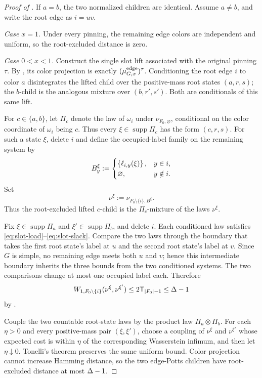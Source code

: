 \begin{proof}[Proof of ]
If \(a=b\), the two normalized children are identical.  Assume
\(a\ne b\), and write the root edge as \(i=uv\).

\emph{Case \(x=1\).}
Under every pinning, the remaining edge colors are independent and
uniform, so the root-excluded distance is zero.

\emph{Case \(0<x<1\).}
Construct the single slot lift associated with the original pinning
\(\tau\).  By , its color projection is exactly
\((\mu^{\mathrm{edge}}_{G,x})^\tau\).  Conditioning the root edge \(i\) to
color \(a\) disintegrates the lifted child over the positive-mass root
states \((a,r,s)\); the \(b\)-child is the analogous mixture over
\((b,r',s')\).  Both are conditionals of this same lift.

For \(c\in\{a,b\}\), let \(\Pi_c\) denote the law of \(\omega_i\) under
\(\nu_{F_0,\varnothing}\), conditional on the color coordinate of
\(\omega_i\) being \(c\).  Thus every
\(\xi\in\operatorname{supp}\Pi_c\) has the form \((c,r,s)\).  For such a
state \(\xi\), delete \(i\) and define the occupied-label family on the
remaining system by
\[
  B_y^\xi:=
  \begin{cases}
    \left\{\ell_{i,y}(\xi)\right\},&y\in i,\\
    \varnothing,&y\notin i.
  \end{cases}
\]
Set
\[
  \nu^\xi:=\nu_{F_0\setminus\{i\},B^\xi}.
\]
Thus the root-excluded lifted \(c\)-child is the \(\Pi_c\)-mixture of the
laws \(\nu^\xi\).

Fix \(\xi\in\operatorname{supp}\Pi_a\) and
\(\xi'\in\operatorname{supp}\Pi_b\), and delete \(i\).  Each conditioned
law satisfies
\eqref{eq:slot-load}--\eqref{eq:slot-slack}.  Compare the two laws through
the boundary that takes the first root state's label at \(u\) and the
second root state's label at \(v\).  Since \(G\) is simple, no remaining
edge meets both \(u\) and \(v\); hence this intermediate boundary inherits
the three bounds from the two conditioned systems.  The two comparisons
change at most one occupied label each.  Therefore
\[
  W_{1,F_0\setminus\{i\}}(\nu^\xi,\nu^{\xi'})
  \le2\mathsf T_{\left|F_0\right|-1}\le\Delta-1
\]
by .

Couple the two countable root-state laws by the product law
\(\Pi_a\otimes\Pi_b\).  For each \(\eta>0\) and every positive-mass pair
\((\xi,\xi')\), choose a coupling of \(\nu^\xi\) and \(\nu^{\xi'}\) whose
expected cost is within \(\eta\) of the corresponding Wasserstein infimum,
and then let \(\eta\downarrow0\).  Tonelli's theorem preserves the same
uniform bound.  Color projection cannot increase Hamming distance, so the
two edge-Potts children have root-excluded distance at most \(\Delta-1\).


\end{proof}
